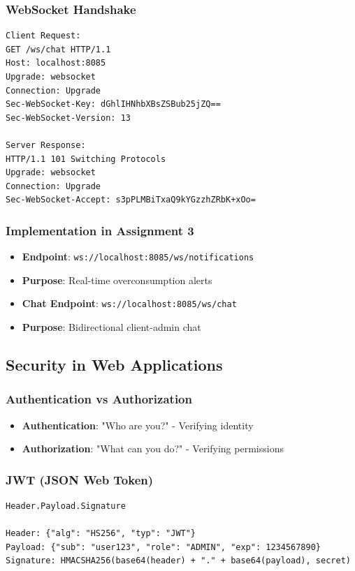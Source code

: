 \documentclass[12pt,a4paper]{article}
\begin{document}
\subsubsection{WebSocket Handshake}
\begin{lstlisting}[caption=WebSocket Handshake Process]
Client Request:
GET /ws/chat HTTP/1.1
Host: localhost:8085
Upgrade: websocket
Connection: Upgrade
Sec-WebSocket-Key: dGhlIHNhbXBsZSBub25jZQ==
Sec-WebSocket-Version: 13

Server Response:
HTTP/1.1 101 Switching Protocols
Upgrade: websocket
Connection: Upgrade
Sec-WebSocket-Accept: s3pPLMBiTxaQ9kYGzzhZRbK+xOo=
\end{lstlisting}

\subsubsection{Implementation in Assignment 3}
\begin{itemize}
    \item \textbf{Endpoint}: \texttt{ws://localhost:8085/ws/notifications}
    \item \textbf{Purpose}: Real-time overconsumption alerts
    \item \textbf{Chat Endpoint}: \texttt{ws://localhost:8085/ws/chat}
    \item \textbf{Purpose}: Bidirectional client-admin chat
\end{itemize}

\subsection{Security in Web Applications}

\subsubsection{Authentication vs Authorization}
\begin{itemize}
    \item \textbf{Authentication}: "Who are you?" - Verifying identity
    \item \textbf{Authorization}: "What can you do?" - Verifying permissions
\end{itemize}

\subsubsection{JWT (JSON Web Token)}
\begin{lstlisting}[caption=JWT Structure]
Header.Payload.Signature

Header: {"alg": "HS256", "typ": "JWT"}
Payload: {"sub": "user123", "role": "ADMIN", "exp": 1234567890}
Signature: HMACSHA256(base64(header) + "." + base64(payload), secret)
\end{lstlisting}
\end{document}
